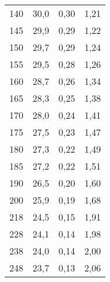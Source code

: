 \documentclass{article}
\begin{document}
\begin{tabular}{llll}
	140            & 30,0                         & 0,30                                                                 & 1,21     \\
	145            & 29,9                         & 0,29                                                                 & 1,22     \\
	150            & 29,7                         & 0,29                                                                 & 1,24     \\
	155            & 29,5                         & 0,28                                                                 & 1,26     \\
	160            & 28,7                         & 0,26                                                                 & 1,34     \\
	165            & 28,3                         & 0,25                                                                 & 1,38     \\
	170            & 28,0                         & 0,24                                                                 & 1,41     \\
	175            & 27,5                         & 0,23                                                                 & 1,47     \\
	180            & 27,3                         & 0,22                                                                 & 1,49     \\
	185            & 27,2                         & 0,22                                                                 & 1,51     \\
	190            & 26,5                         & 0,20                                                                 & 1,60     \\
	200            & 25,9                         & 0,19                                                                 & 1,68     \\
	218            & 24,5                         & 0,15                                                                 & 1,91     \\
	228            & 24,1                         & 0,14                                                                 & 1,98     \\
	238            & 24,0                         & 0,14                                                                 & 2,00     \\
	248            & 23,7                         & 0,13                                                                 & 2,06     \\

\end{tabular}
\end{document}
